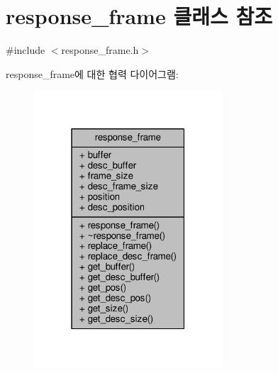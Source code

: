 \hypertarget{classavdecc__lib_1_1response__frame}{}\section{response\+\_\+frame 클래스 참조}
\label{classavdecc__lib_1_1response__frame}


{\ttfamily \#include $<$response\+\_\+frame.\+h$>$}



response\+\_\+frame에 대한 협력 다이어그램\+:
\nopagebreak
\begin{figure}[H]
\begin{center}
\leavevmode
\includegraphics[width=199pt]{classavdecc__lib_1_1response__frame__coll__graph}
\end{center}
\end{figure}

